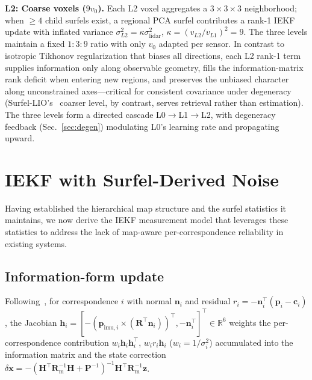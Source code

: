\documentclass[conference]{IEEEtran}
\newcommand{\R}{\mathbb{R}}
\newcommand{\bvec}[1]{\mathbf{#1}}
\begin{document}
\textbf{L2: Coarse voxels ($9v_0$).}
Each L2 voxel aggregates a $3{\times}3{\times}3$ neighborhood; when
$\ge 4$ child surfels exist, a regional PCA surfel contributes a
rank-1 IEKF update with inflated variance
$\sigma^2_{L2}{=}\kappa\sigma^2_\mathrm{lidar}$,
$\kappa{=}(v_{L2}/v_{L1})^2{=}9$. The three levels maintain a fixed
$1{:}3{:}9$ ratio with only $v_0$ adapted per sensor.
In contrast to isotropic Tikhonov regularization that biases all
directions, each L2 rank-1 term supplies information only along
observable geometry, fills the information-matrix rank deficit when
entering new regions, and preserves the unbiased character along
unconstrained axes—critical for consistent covariance under
degeneracy~\cite{li2025lodestar} (Surfel-LIO's~\cite{lv2025surfellio}
coarser level, by contrast, serves retrieval rather than estimation).
The three levels form a directed cascade L0$\to$L1$\to$L2, with
degeneracy feedback (Sec.~\ref{sec:degen}) modulating L0's learning
rate and propagating upward.

\section{IEKF with Surfel-Derived Noise}\label{sec:noise}

Having established the hierarchical map structure and the surfel
statistics it maintains, we now derive the IEKF measurement model
that leverages these statistics to address the lack of map-aware
per-correspondence reliability in existing systems.

\subsection{Information-form update}
Following~\cite{xu2021fastlio}, for correspondence $i$ with normal
$\bvec{n}_i$ and residual
$r_i = -\bvec{n}_i^\top(\bvec{p}_i - \bvec{c}_i)$, the Jacobian
$\bvec{h}_i = [-(\bvec{p}_{\mathrm{imu},i} \times
(\bvec{R}^\top \bvec{n}_i))^\top, -\bvec{n}_i^\top]^\top \in \R^6$
weights the per-correspondence contribution
$w_i\bvec{h}_i\bvec{h}_i^\top$, $w_i r_i\bvec{h}_i$ ($w_i{=}1/\sigma^2_i$)
accumulated into the information matrix and the state correction
$\delta\bvec{x} = -(\bvec{H}^\top\bvec{R}_\mathrm{m}^{-1}\bvec{H}
+ \bvec{P}^{-1})^{-1}\bvec{H}^\top\bvec{R}_\mathrm{m}^{-1}\bvec{z}$.
\end{document}
